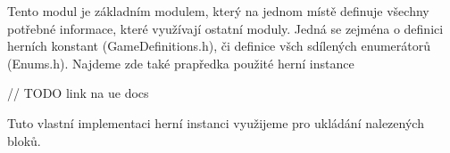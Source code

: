 
Tento modul je základním modulem, který na jednom místě definuje všechny potřebné informace, které využívají ostatní moduly. Jedná se zejména o definici herních konstant (GameDefinitions.h), či definice všch sdílených enumerátorů (Enums.h). Najdeme zde také prapředka použité herní instance 

// TODO link na ue docs

Tuto vlastní implementaci herní instanci využijeme pro ukládání nalezených bloků.